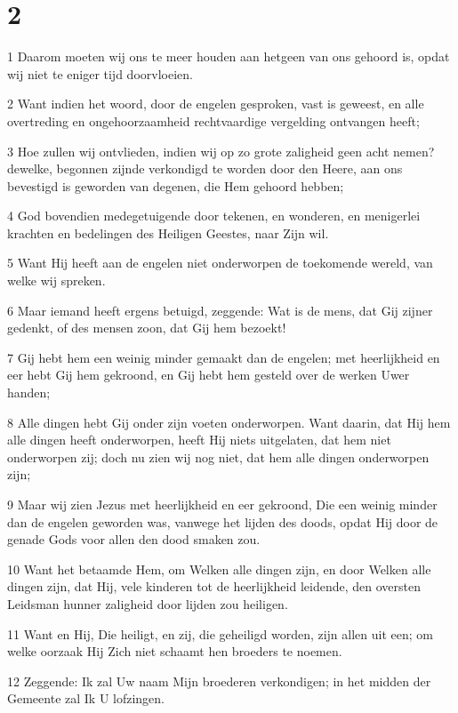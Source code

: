 \chapter{2}

\par 1 Daarom moeten wij ons te meer houden aan hetgeen van ons gehoord is, opdat wij niet te eniger tijd doorvloeien.
\par 2 Want indien het woord, door de engelen gesproken, vast is geweest, en alle overtreding en ongehoorzaamheid rechtvaardige vergelding ontvangen heeft;
\par 3 Hoe zullen wij ontvlieden, indien wij op zo grote zaligheid geen acht nemen? dewelke, begonnen zijnde verkondigd te worden door den Heere, aan ons bevestigd is geworden van degenen, die Hem gehoord hebben;
\par 4 God bovendien medegetuigende door tekenen, en wonderen, en menigerlei krachten en bedelingen des Heiligen Geestes, naar Zijn wil.
\par 5 Want Hij heeft aan de engelen niet onderworpen de toekomende wereld, van welke wij spreken.
\par 6 Maar iemand heeft ergens betuigd, zeggende: Wat is de mens, dat Gij zijner gedenkt, of des mensen zoon, dat Gij hem bezoekt!
\par 7 Gij hebt hem een weinig minder gemaakt dan de engelen; met heerlijkheid en eer hebt Gij hem gekroond, en Gij hebt hem gesteld over de werken Uwer handen;
\par 8 Alle dingen hebt Gij onder zijn voeten onderworpen. Want daarin, dat Hij hem alle dingen heeft onderworpen, heeft Hij niets uitgelaten, dat hem niet onderworpen zij; doch nu zien wij nog niet, dat hem alle dingen onderworpen zijn;
\par 9 Maar wij zien Jezus met heerlijkheid en eer gekroond, Die een weinig minder dan de engelen geworden was, vanwege het lijden des doods, opdat Hij door de genade Gods voor allen den dood smaken zou.
\par 10 Want het betaamde Hem, om Welken alle dingen zijn, en door Welken alle dingen zijn, dat Hij, vele kinderen tot de heerlijkheid leidende, den oversten Leidsman hunner zaligheid door lijden zou heiligen.
\par 11 Want en Hij, Die heiligt, en zij, die geheiligd worden, zijn allen uit een; om welke oorzaak Hij Zich niet schaamt hen broeders te noemen.
\par 12 Zeggende: Ik zal Uw naam Mijn broederen verkondigen; in het midden der Gemeente zal Ik U lofzingen.
